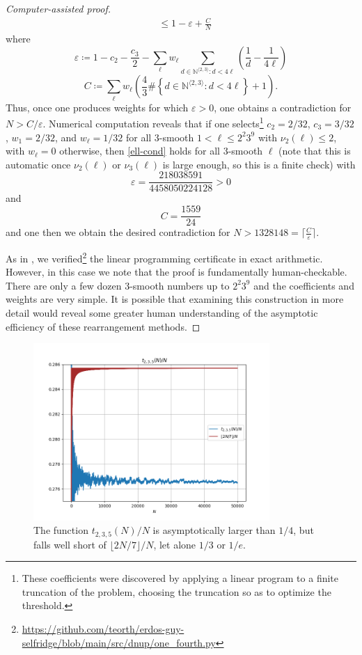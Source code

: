 \documentclass[12pt,a4paper,reqno]{amsart}
\numberwithin{equation}{section}
\theoremstyle{plain}
\theoremstyle{definition}
\newcommand\N{\mathbb{N}}
\newcommand\eps{\varepsilon}
\begin{document}
\begin{proof}[Computer-assisted proof]
\begin{align*}
    &\leq 1 - \eps  + \frac{C}{N}
  \end{align*}
  where
  $$ \eps \coloneqq 1 -  
c_2 - \frac{c_3}{2} - \sum_{\ell} w_\ell \sum_{d \in \N^{\langle 2,3 \rangle}: d < 4\ell} \left( \frac{1}{d} - \frac{1}{4\ell} \right)$$
  $$ C \coloneqq \sum_\ell w_\ell \left(\frac{4}{3} \# \left\{ d \in \N^{\langle 2,3 \rangle}: d < 4\ell \right\} + 1\right).$$
 Thus, once one produces weights for which $\eps>0$, one obtains a contradiction for $N > C/\eps$.
  Numerical computation reveals that if one selects\footnote{These coefficients were discovered by applying a linear program to a finite truncation of the problem, choosing the truncation so as to optimize the threshold.} $c_2 = 2/32$, $c_3 = 3/32$, $w_1 = 2/32$, and $w_\ell = 1/32$ for all $3$-smooth $1 < \ell \leq 2^2 3^9$ with $\nu_2(\ell) \leq 2$, with $w_\ell=0$ otherwise, then  \eqref{ell-cond} holds for all $3$-smooth $\ell$ (note that this is automatic once $\nu_2(\ell)$ or $\nu_3(\ell)$ is large enough, so this is a finite check) with
$$\eps = \frac{218038591}{4458050224128} > 0$$
and
$$ C = \frac{1559}{24}$$
and one then we obtain the desired contradiction for $N > 1328148 = \lceil\frac{C}{\eps}\rceil$.

As in , we verified\footnote{\url{https://github.com/teorth/erdos-guy-selfridge/blob/main/src/dnup/one_fourth.py}} the linear programming certificate in exact arithmetic.
However, in this case we note that the proof is fundamentally human-checkable.
There are only a few dozen $3$-smooth numbers up to $2^2 3^9$ and the coefficients and weights are very simple.
It is possible that examining this construction in more detail would reveal some greater human understanding of the asymptotic efficiency of these rearrangement methods.
\end{proof}

\begin{figure}
  \centering
  \includegraphics[width=0.8\textwidth]{t5.png}
  \vspace{-8pt}
  \caption{The function $t_{2,3,5}(N)/N$ is asymptotically larger than $1/4$, but falls well short of $\lfloor 2N/7 \rfloor/N$, let alone $1/3$ or $1/e$.}\label{fig-t5}
\end{figure}
\end{document}
